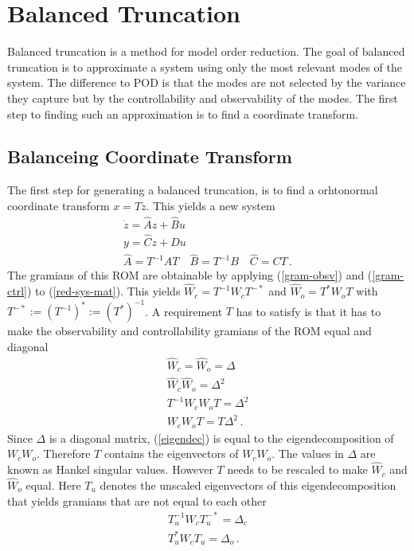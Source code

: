 \section{Balanced Truncation} \label{bt}
Balanced truncation is a method for model order reduction.
The goal of balanced truncation is to approximate a system using only the most relevant modes of the system.
The difference to POD is that the modes are not selected by the variance they capture but by the controllability and observability of the modes.
The first step to finding such an approximation is to find a coordinate transform.
\subsection{Balanceing Coordinate Transform} \label{balre}
The first step for generating a balanced truncation, is to find a orhtonormal coordinate transform \(x = Tz\).
This yields a new system
\begin{gather}
\dot{z} = \hat{A}z + \hat{B}u \label{z1}\\
y = \hat{C}z + Du \label{z2} \\
\hat{A} = T^{-1}AT \quad \hat{B} = T^{-1}B \quad \hat{C} = CT \,.\label{red-sys-mat}
\end{gather}
The gramians of this ROM are obtainable by applying  (\ref{gram-obsv}) and (\ref{gram-ctrl}) to (\ref{red-sys-mat}).
This yields \(\hat{W}_c = T^{-1}W_cT^{-*}\) and \(\hat{W}_o = T^{*}W_oT\) with  \(T^{-*} := (T^{-1})^{*} := (T^{*})^{-1}\).
A requirement \(T\) has to satisfy is that it has to make the observability and controllability gramians of the ROM equal and diagonal
\begin{gather}
\hat{W}_c = \hat{W}_o = \Delta \\
\hat{W}_c \hat{W}_o = \Delta^{2} \\
T^{-1}W_cW_oT = \Delta^{2} \\
W_cW_oT = T\Delta^{2}  \,. \label{eigendec}
\end{gather}
Since \(\Delta\) is a diagonal matrix, (\ref{eigendec}) is equal to the eigendecomposition of \(W_cW_o\).
Therefore \(T\) contains the eigenvectors of \(W_cW_o\).
The values in \(\Delta\) are known as Hankel singular values.
However \(T\) needs to be rescaled to make \(\hat{W}_c\) and \(\hat{W}_o\) equal.
Here \(T_u\) denotes the unscaled eigenvectors of this eigendecomposition that yields gramians that are not equal to each other
\begin{gather}
T_u^{-1}W_cT_u^{-*} = \Delta_c \label{e1}\\
T_u^{*}W_cT_u = \Delta_o  \,. \label{e2}
\end{gather}
